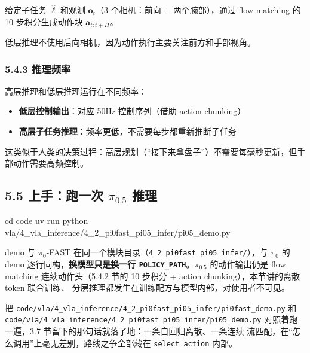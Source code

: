 \documentclass[
  chinese,
]{ctexart}
\newenvironment{Shaded}{\begin{snugshade}}{\end{snugshade}}
\newcommand{\BuiltInTok}[1]{\textcolor[rgb]{0.00,0.23,0.31}{#1}}
\newcommand{\ExtensionTok}[1]{\textcolor[rgb]{0.00,0.23,0.31}{#1}}
\newcommand{\NormalTok}[1]{\textcolor[rgb]{0.00,0.23,0.31}{#1}}
\providecommand{\tightlist}{%
  \setlength{\itemsep}{0pt}\setlength{\parskip}{0pt}}
\begin{document}
给定子任务 \(\hat{\ell}\) 和观测 \(\mathbf{o}_t\)（3 个相机：前向 +
两个腕部），通过 flow matching 的 10 步积分生成动作块
\(\mathbf{a}_{t:t+H}\)。

低层推理不使用后向相机，因为动作执行主要关注前方和手部视角。

\subsubsection{5.4.3 推理频率}\label{ux63a8ux7406ux9891ux7387}

高层推理和低层推理运行在不同频率：

\begin{itemize}
\tightlist
\item
  \textbf{低层控制输出}：对应 50Hz 控制序列（借助 action chunking）
\item
  \textbf{高层子任务推理}：频率更低，不需要每步都重新推断子任务
\end{itemize}

这类似于人类的决策过程：高层规划（``接下来拿盘子''）不需要每毫秒更新，但手部动作需要高频控制。

\subsection{\texorpdfstring{5.5 上手：跑一次 \(\pi_{0.5}\)
推理}{5.5 上手：跑一次 \textbackslash pi\_\{0.5\} 推理}}\label{ux4e0aux624bux8dd1ux4e00ux6b21-pi_0.5-ux63a8ux7406}

\begin{Shaded}
\begin{Highlighting}[]
\BuiltInTok{cd}\NormalTok{ code}
\ExtensionTok{uv}\NormalTok{ run python vla/4\_vla\_inference/4\_2\_pi0fast\_pi05\_infer/pi05\_demo.py}
\end{Highlighting}
\end{Shaded}

demo 与 \(\pi_0\)-FAST
在同一个模块目录（\texttt{4\_2\_pi0fast\_pi05\_infer/}），与 \(\pi_0\)
的 demo 逐行同构，\textbf{换模型只是换一行
\texttt{POLICY\_PATH}}。\(\pi_{0.5}\) 的动作输出仍是 flow matching
连续动作头（5.4.2 节的 10 步积分 + action chunking），本节讲的离散 token
联合训练、 分层推理都发生在训练配方与模型内部，对使用者不可见。

把
\texttt{code/vla/4\_vla\_inference/4\_2\_pi0fast\_pi05\_infer/pi0fast\_demo.py}
和
\texttt{code/vla/4\_vla\_inference/4\_2\_pi0fast\_pi05\_infer/pi05\_demo.py}
对照着跑一遍，3.7 节留下的那句话就落了地：一条自回归离散、一条连续
流匹配，在``怎么调用''上毫无差别，路线之争全部藏在
\texttt{select\_action} 内部。
\end{document}
